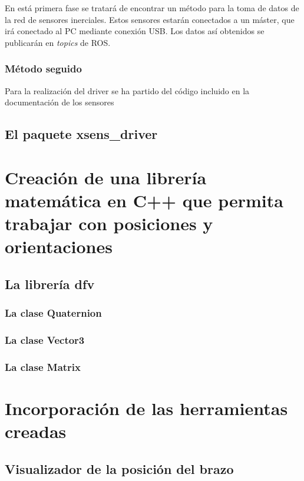 \documentclass[10pt,a4paper]{report}
\begin{document}
En está primera fase se tratará de encontrar un método para la toma de datos de la red de sensores inerciales. Estos sensores estarán conectados a un máster, que irá conectado al PC mediante conexión USB. Los datos así obtenidos se publicarán en \textit{topics} de ROS.

\subsubsection{Método seguido}

Para la realización del driver se ha partido del código incluido en la documentación de los sensores

\subsection{El paquete xsens\_driver}



\section{Creación de una librería matemática en C++ que permita trabajar con posiciones y orientaciones}


\subsection{La librería dfv}

\subsubsection{La clase Quaternion}

\subsubsection{La clase Vector3}

\subsubsection{La clase Matrix}

\section{Incorporación de las herramientas creadas}

\subsection{Visualizador de la posición del brazo}
\end{document}
